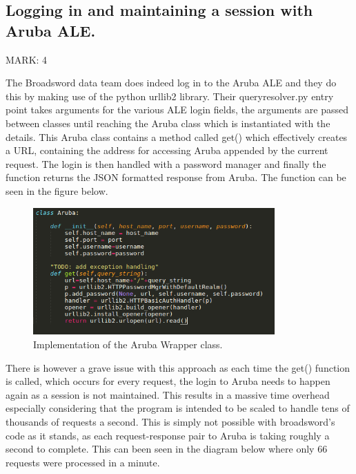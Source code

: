 \documentclass{article}
\begin{document}
\subsection{Logging in and maintaining a session with Aruba ALE.}

\begin{flushleft}
MARK: 4
\end{flushleft}

\begin{flushleft}
The Broadsword data team does indeed log in to the Aruba ALE and they do this by making use of the python urllib2 library. Their query\textunderscore resolver.py entry point takes arguments for the various ALE login fields, the arguments are passed between classes until reaching the Aruba class which is instantiated with the details. This Aruba class contains a method called get() which effectively creates a URL, containing the address for accessing Aruba appended by the current request. The login is then handled with a password manager and finally the function returns the JSON formatted response from Aruba. The function can be seen in the figure below.
\end{flushleft}

\begin{figure}[ht]
  \includegraphics[width=350px]{Images/Get_Function.png}
  \caption{Implementation of the Aruba Wrapper class.}
  \label{get() function.}
\end{figure}

\begin{flushleft}
There is however a grave issue with this approach as each time the get() function is called, which occurs for every request, the login to Aruba needs to happen again as a session is not maintained. This results in a massive time overhead especially considering that the program is intended to be scaled to handle tens of thousands of requests a second. This is simply not possible with broadsword’s code as it stands, as each request-response pair to Aruba is taking roughly a second to complete. This can been seen in the diagram below where only 66 requests were processed in a minute.
\end{flushleft}
\end{document}
